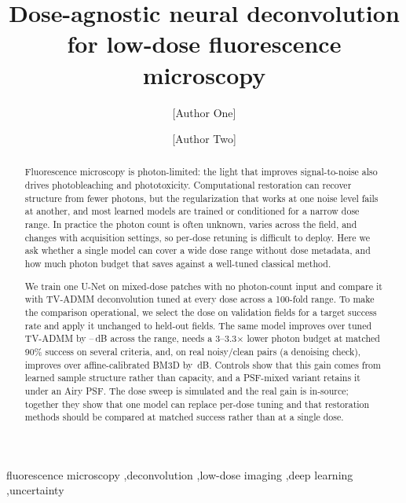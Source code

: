 \documentclass[preprint,12pt]{elsarticle}
\begin{document}
\begin{frontmatter}
\title{Dose-agnostic neural deconvolution for low-dose fluorescence microscopy}
\author[1]{[Author One]}
\author[2]{[Author Two]}
\begin{abstract}
Fluorescence microscopy is photon-limited: the light that improves
signal-to-noise also drives photobleaching and phototoxicity. Computational
restoration can recover structure from fewer photons, but the regularization
that works at one noise level fails at another, and most learned models are
trained or conditioned for a narrow dose range. In practice the photon count is
often unknown, varies across the field, and changes with acquisition settings,
so per-dose retuning is difficult to deploy. Here we ask whether a single model
can cover a wide dose range without dose metadata, and how much photon budget
that saves against a well-tuned classical method.

We train one U-Net on mixed-dose patches with no photon-count input and compare
it with TV-ADMM deconvolution tuned at every dose across a 100-fold range. To
make the comparison operational, we select the dose on validation fields for a
target success rate and apply it unchanged to held-out fields. The same model
improves over tuned TV-ADMM by \BestGainMin--\BestGainMax\,dB across the range,
needs a 3--3.3$\times$ lower photon budget at matched 90\% success on several
criteria, and, on real noisy/clean pairs (a denoising check), improves over
affine-calibrated BM3D by \RealGain\,dB. Controls show that this gain comes
from learned sample structure rather than capacity, and a PSF-mixed variant
retains it under an Airy PSF. The dose sweep is simulated and the real gain is
in-source; together they show that one model can replace per-dose tuning and
that restoration methods should be compared at matched success rather than at a
single dose.
\end{abstract}
\begin{keyword}
fluorescence microscopy \sep deconvolution \sep low-dose imaging \sep deep learning \sep uncertainty
\end{keyword}
\end{frontmatter}
\linenumbers
\end{document}
